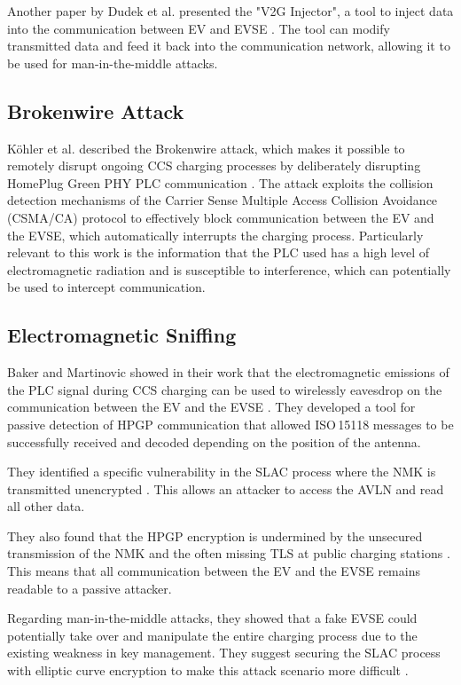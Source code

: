\documentclass[sigconf]{acmart}
\begin{document}
Another paper by Dudek et al. presented the "V2G Injector", a tool to inject data into the communication between EV and EVSE \citep[pp.\,24--25]{dudek-v2g-2019}. The tool can modify transmitted data and feed it back into the communication network, allowing it to be used for man-in-the-middle attacks.

\subsection{Brokenwire Attack}
Köhler et al. described the Brokenwire attack, which makes it possible to remotely disrupt ongoing CCS charging processes by deliberately disrupting HomePlug Green PHY PLC communication \citep[pp.\,4--6]{kohler-brokenwire-2022}. The attack exploits the collision detection mechanisms of the Carrier Sense Multiple Access Collision Avoidance (CSMA/CA) protocol to effectively block communication between the EV and the EVSE, which automatically interrupts the charging process. Particularly relevant to this work is the information that the PLC used has a high level of electromagnetic radiation and is susceptible to interference, which can potentially be used to intercept communication.

\subsection{Electromagnetic Sniffing}
Baker and Martinovic showed in their work that the electromagnetic emissions of the PLC signal during CCS charging can be used to wirelessly eavesdrop on the communication between the EV and the EVSE \citep[pp.\,1--2, 7--8]{baker-losing-2019}. They developed a tool for passive detection of HPGP communication that allowed ISO\,15118 messages to be successfully received and decoded depending on the position of the antenna.

They identified a specific vulnerability in the SLAC process where the NMK is transmitted unencrypted \citep[pp.\,9--10]{baker-losing-2019}. This allows an attacker to access the AVLN and read all other data.

They also found that the HPGP encryption is undermined by the unsecured transmission of the NMK and the often missing TLS at public charging stations \citep[pp.\,9--12]{baker-losing-2019}. This means that all communication between the EV and the EVSE remains readable to a passive attacker.

\iffalse
Regarding man-in-the-middle attacks, they showed that a fake EVSE could potentially take over and manipulate the entire charging process due to the existing weakness in key management. They suggest securing the SLAC process with elliptic curve encryption to make this attack scenario more difficult \citep[pp.\,17--18]{baker-losing-2019}.
\end{document}

